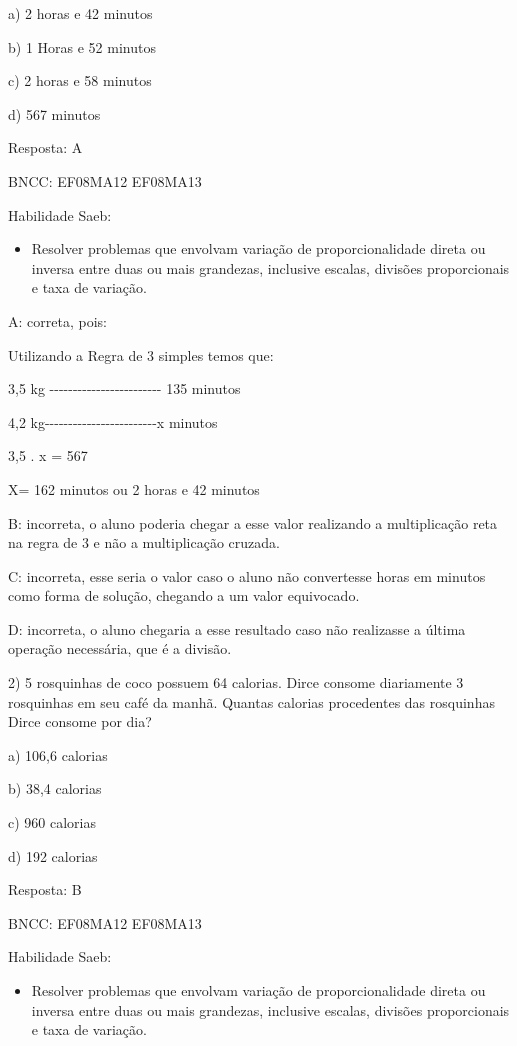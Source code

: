 a) 2 horas e 42 minutos

b) 1 Horas e 52 minutos

c) 2 horas e 58 minutos

d) 567 minutos

Resposta: A

BNCC: EF08MA12 EF08MA13

Habilidade Saeb:

\begin{itemize}
\tightlist
\item
  Resolver problemas que envolvam variação de proporcionalidade direta
  ou inversa entre duas ou mais grandezas, inclusive escalas, divisões
  proporcionais e taxa de variação.
\end{itemize}

A: correta, pois:

Utilizando a Regra de 3 simples temos que:

3,5 kg
-\/-\/-\/-\/-\/-\/-\/-\/-\/-\/-\/-\/-\/-\/-\/-\/-\/-\/-\/-\/-\/-\/-\/-
135 minutos

4,2
kg-\/-\/-\/-\/-\/-\/-\/-\/-\/-\/-\/-\/-\/-\/-\/-\/-\/-\/-\/-\/-\/-\/-\/-x
minutos

3,5 . x = 567

X= 162 minutos ou 2 horas e 42 minutos

B: incorreta, o aluno poderia chegar a esse valor realizando a
multiplicação reta na regra de 3 e não a multiplicação cruzada.

C: incorreta, esse seria o valor caso o aluno não convertesse horas em
minutos como forma de solução, chegando a um valor equivocado.

D: incorreta, o aluno chegaria a esse resultado caso não realizasse a
última operação necessária, que é a divisão.

2) 5 rosquinhas de coco possuem 64 calorias. Dirce consome diariamente 3
rosquinhas em seu café da manhã. Quantas calorias procedentes das
rosquinhas Dirce consome por dia?

a) 106,6 calorias

b) 38,4 calorias

c) 960 calorias

d) 192 calorias

Resposta: B

BNCC: EF08MA12 EF08MA13

Habilidade Saeb:

\begin{itemize}
\tightlist
\item
  Resolver problemas que envolvam variação de proporcionalidade direta
  ou inversa entre duas ou mais grandezas, inclusive escalas, divisões
  proporcionais e taxa de variação.
\end{itemize}


